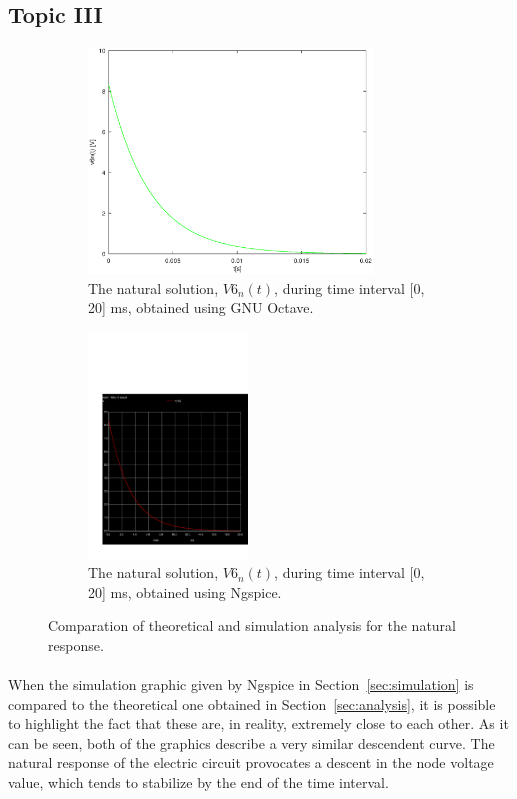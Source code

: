 \subsection{Topic III}
\label{subsec:third_topic_error}

\begin{figure}[H]

\begin{subfigure}{0.5\textwidth}
\includegraphics[width=0.9\linewidth, height=6cm]{natural.eps} 
\caption{The natural solution, $V6_n(t)$, during time interval [0, 20] ms, obtained using GNU Octave.}
\label{fig:theo_third}
\end{subfigure}
\begin{subfigure}{0.5\textwidth}
\includegraphics[width=0.9\linewidth, height=6cm]{trans1.pdf}
\caption{The natural solution, $V6_n(t)$, during time interval [0, 20] ms, obtained using Ngspice.}
\label{fig:natural}
\end{subfigure}

\caption{Comparation of theoretical and simulation analysis for the natural response.}
\label{fig:compar_1}
\end{figure}

\paragraph{}
When the simulation graphic given by Ngspice in Section~\ref{sec:simulation} is compared to the theoretical one obtained in Section~\ref{sec:analysis}, it is possible to highlight the fact that these are, in reality, extremely close to each other. As it can be seen, both of the graphics describe a very similar descendent curve. The natural response of the electric circuit provocates a descent in the node voltage value, which tends to stabilize by the end of the time interval.

